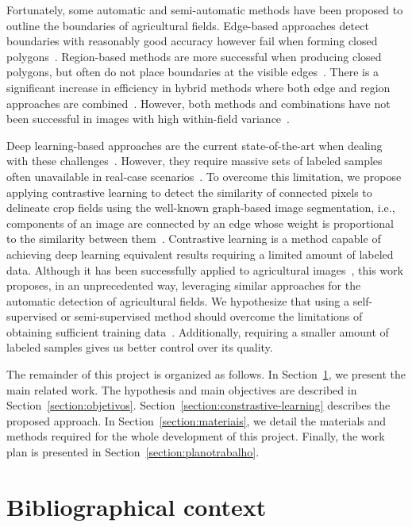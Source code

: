 \documentclass[12pt]{article}
\begin{document}
Fortunately, some automatic and semi-automatic methods have been proposed to outline the boundaries of agricultural fields. Edge-based approaches detect boundaries with reasonably good accuracy however fail when forming closed polygons~\cite{taravat2021,waldner2021}. Region-based methods are more successful when producing closed polygons, but often do not place boundaries at the visible edges~\cite{taravat2021}. There is a significant increase in efficiency in hybrid methods where both edge and region approaches are combined~\cite{garcia2017}. However, both methods and combinations have not been successful in images with high within-field variance~\cite{mueller2004,zhang2021}.

Deep learning-based approaches are the current state-of-the-art when dealing with these challenges~\citep{waldner2021,zhang2021}. However, they require massive sets of labeled samples often unavailable in real-case scenarios~\cite{kokkinos2016, ma2019,kamilaris2018}. 
To overcome this limitation, we propose applying contrastive learning to detect the similarity of connected pixels to delineate crop fields using the well-known graph-based image segmentation, i.e., components of an image are connected by an edge whose weight is proportional to the similarity between them~\citep{felzenszwalb2004}. Contrastive learning is a method capable of achieving deep learning equivalent results requiring a limited amount of labeled data. Although it has been successfully applied to agricultural images~\cite{guldenring2021,jansel2021}, this work proposes, in an unprecedented way, leveraging similar approaches for the automatic detection of agricultural fields. We hypothesize that using a self-supervised or semi-supervised method should overcome the limitations of obtaining sufficient training data~\citep{yang2020}. Additionally, requiring a smaller amount of labeled samples gives us better control over its quality.

The remainder of this project is organized as follows. In Section~\ref{section:bibliografia}, we present the main related work. The hypothesis and main objectives are described in Section~\ref{section:objetivos}. Section~\ref{section:constrastive-learning} describes the proposed approach. In Section~\ref{section:materiais}, we detail the materials and methods required for the whole development of this project. Finally, the work plan is presented in Section~\ref{section:planotrabalho}.

\section{Bibliographical context}\label{section:bibliografia}
\end{document}
